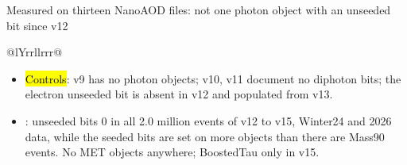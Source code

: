 \begin{frame}{Measured on thirteen NanoAOD files: not one photon object with an unseeded bit since v12}
{\begin{tabularx}{\linewidth}{@{}lYrrllrrr@{}}
  \end{tabularx}}
  \par\vspace{5pt}
  \begin{itemize}\scriptsize
    \item \hl{Controls}: v9 has no photon objects; v10, v11 document no diphoton bits; the electron unseeded bit is
          absent in v12 and populated from v13.
    \item {}: unseeded bits 0 in all 2.0 million events of v12 to v15, Winter24 and 2026 data, while the seeded bits
          are set on more objects than there are Mass90 events. No MET objects anywhere; BoostedTau only in v15.
  \end{itemize}
\end{frame}

